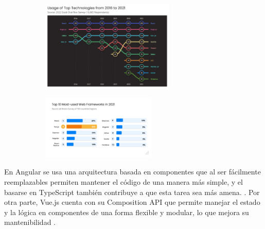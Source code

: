 \documentclass[twoside]{article}
\begin{document}
\begin{figure}[H]
	\caption{Uso de las principales tecnologías desde 2016 hasta 2021}
    \begin{subfigure}{1.0\textwidth}
	\includegraphics[width=0.7\textwidth]{vue-usage-from-2016-to-2021.png}
    \end{subfigure}
	\label{fig:stackOverflowSurvey}
\end{figure}
\vspace{-1.0\baselineskip}

\begin{figure}[H]
	\caption{10 Frameworks Web más usados en 2021}
    \begin{subfigure}{1.0\textwidth}
	\includegraphics[width=0.6\textwidth]{most-used-web-frameworks-2021-survey-1-1024x576.png}
    \end{subfigure}
	\label{fig:jetBrainsSurvey}
\end{figure}
\vspace{-1.0\baselineskip}

En Angular se usa una arquitectura basada en componentes que al ser fácilmente reemplazables permiten mantener el código de una manera más simple, y el basarse en TypeScript también contribuye a que esta tarea sea más amena. \parencite{altexsoftAngular}. Por otra parte, Vue.js cuenta con su Composition API que permite manejar el estado y la lógica en componentes de una forma flexible y modular, lo que mejora su mantenibilidad \parencite{theodosiou}.
\end{document}
